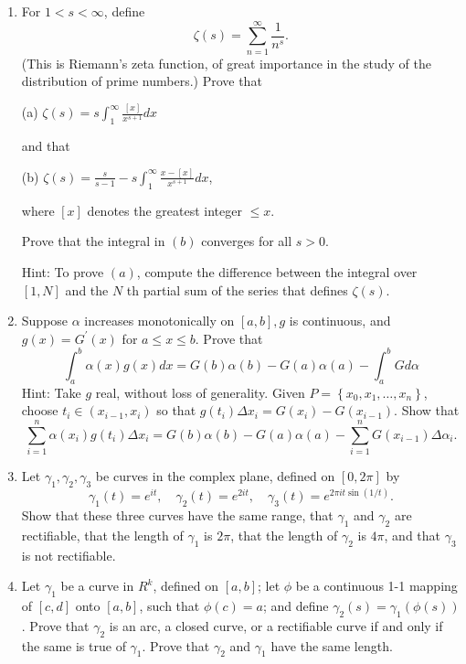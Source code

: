 \documentclass[10pt]{article}
\begin{document}
\begin{enumerate}
  \item For $1<s<\infty$, define
  $$
  \zeta(s)=\sum_{n=1}^{\infty} \frac{1}{n^{s}} .
  $$
  (This is Riemann's zeta function, of great importance in the study of the distribution of prime numbers.) Prove that

  (a) $\zeta(s)=s \int_{1}^{\infty} \frac{[x]}{x^{s+1}} d x$

  and that

  (b) $\zeta(s)=\frac{s}{s-1}-s \int_{1}^{\infty} \frac{x-[x]}{x^{s+1}} d x$,

  where $[x]$ denotes the greatest integer $\leq x$.

  Prove that the integral in $(b)$ converges for all $s>0$.

  Hint: To prove $(a)$, compute the difference between the integral over $[1, N]$ and the $N$ th partial sum of the series that defines $\zeta(s)$.

  \item Suppose $\alpha$ increases monotonically on $[a, b], g$ is continuous, and $g(x)=G^{\prime}(x)$ for $a \leq x \leq b$. Prove that
  $$
  \int_{a}^{b} \alpha(x) g(x) d x=G(b) \alpha(b)-G(a) \alpha(a)-\int_{a}^{b} G d \alpha
  $$
  Hint: Take $g$ real, without loss of generality. Given $P=\left\{x_{0}, x_{1}, \ldots, x_{n}\right\}$, choose $t_{i} \in\left(x_{i-1}, x_{i}\right)$ so that $g\left(t_{i}\right) \Delta x_{i}=G\left(x_{i}\right)-G\left(x_{i-1}\right)$. Show that
  $$
  \sum_{i=1}^{n} \alpha\left(x_{i}\right) g\left(t_{i}\right) \Delta x_{i}=G(b) \alpha(b)-G(a) \alpha(a)-\sum_{i=1}^{n} G\left(x_{i-1}\right) \Delta \alpha_{i} .
  $$

  \item Let $\gamma_{1}, \gamma_{2}, \gamma_{3}$ be curves in the complex plane, defined on $[0,2 \pi]$ by
  $$
  \gamma_{1}(t)=e^{i t}, \quad \gamma_{2}(t)=e^{2 i t}, \quad \gamma_{3}(t)=e^{2 \pi i t \sin (1 / t)} .
  $$
  Show that these three curves have the same range, that $\gamma_{1}$ and $\gamma_{2}$ are rectifiable, that the length of $\gamma_{1}$ is $2 \pi$, that the length of $\gamma_{2}$ is $4 \pi$, and that $\gamma_{3}$ is not rectifiable.

  \item Let $\gamma_{1}$ be a curve in $R^{k}$, defined on $[a, b]$; let $\phi$ be a continuous 1-1 mapping of $[c, d]$ onto $[a, b]$, such that $\phi(c)=a$; and define $\gamma_{2}(s)=\gamma_{1}(\phi(s))$. Prove that $\gamma_{2}$ is an arc, a closed curve, or a rectifiable curve if and only if the same is true of $\gamma_{1}$. Prove that $\gamma_{2}$ and $\gamma_{1}$ have the same length.
\end{enumerate}
\end{document}
